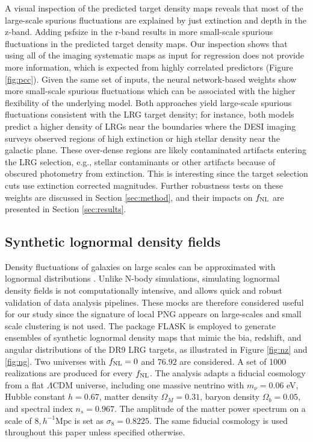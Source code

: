 A visual inspection of the predicted target density maps reveals that most of the large-scale spurious fluctuations are explained by just extinction and depth in the z-band. Adding psfsize in the r-band results in more small-scale spurious fluctuations in the predicted target density maps. Our inspection shows that using all of the imaging systematic maps as input for regression does not provide more information, which is expected from highly correlated predictors (Figure \ref{fig:pcc}). Given the same set of inputs, the neural network-based weights show more small-scale spurious fluctuations which can be associated with the higher flexibility of the underlying model. Both approaches yield large-scale spurious fluctuations consistent with the LRG target density; for instance, both models predict a higher density of LRGs near the boundaries where the DESI imaging surveys observed regions of high extinction or high stellar density near the galactic plane. These over-dense regions are likely contaminated artifacts entering the LRG selection, e.g., stellar contaminants or other artifacts because of obscured photometry from extinction. This is interesting since the target selection cuts use extinction corrected magnitudes. Further robustness tests on these weights are discussed in Section \ref{sec:method}, and their impacts on $f_{\rm NL}$ are presented in Section \ref{sec:results}.


\subsection{Synthetic lognormal density fields}\label{ssec:mocks}
Density fluctuations of galaxies on large scales can be approximated with lognormal distributions \citep{coles1991}. Unlike N-body simulations, simulating lognormal density fields is not computationally intensive, and allows quick and robust validation of data analysis pipelines. These mocks are therefore considered useful for our study since the signature of local PNG appears on large-scales and small scale clustering is not used. The package \textsc{FLASK} \citep[Full-sky Lognormal Astro-fields Simulation Kit;][]{Xavier_2016} is employed to generate ensembles of synthetic lognormal density maps that mimic the bia, redshift, and angular distributions of the DR9 LRG targets, as illustrated in Figure \ref{fig:nz} and \ref{fig:ng}. Two universes with $f_{\rm NL}=0$ and $76.92$ are considered. A set of 1000 realizations are produced for every $f_{\rm NL}$. The analysis adapts a fiducial cosmology from a flat $\Lambda$CDM universe, including one massive neutrino with $m_{\nu}=0.06$ eV, Hubble constant $h = 0.67$, matter density $\Omega_{M}=0.31$, baryon density $\Omega_{b}=0.05$, and spectral index $n_{s}=0.967$. The amplitude of the matter power spectrum on a scale of $8, h^{-1} \text{Mpc}$ is set as $\sigma_{8}=0.8225$. The same fiducial cosmology is used throughout this paper unless specified otherwise. 

